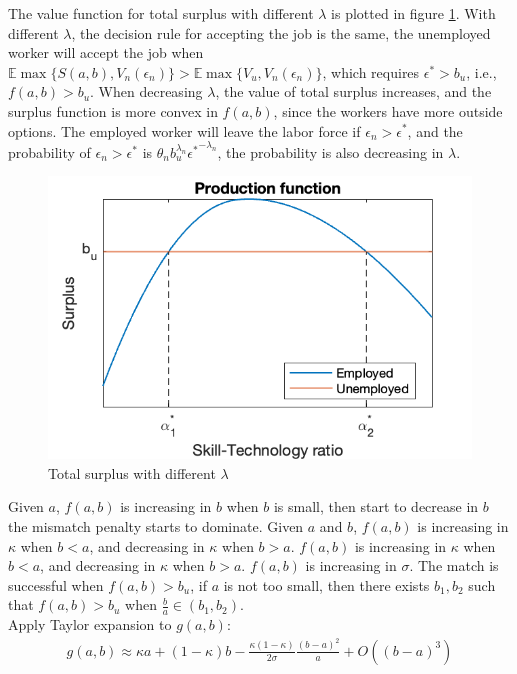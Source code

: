 \documentclass{article}
\newcommand{\E}{\mathbb{E}}
\newcommand{\1}{\mathbb{1}}
\begin{document}
The value function for total surplus with different $\lambda$ is plotted in figure \ref{Analytical1}. With different $\lambda$, the decision rule for accepting the job is the same, the unemployed worker will accept the job when $\E\max\{S(a,b),V_n(\epsilon_n)\}>\E\max \{V_u,V_n(\epsilon_n)\}$, which requires $\epsilon^*>b_u$, i.e., $f(a,b)>b_u$. When decreasing $\lambda$, the value of total surplus increases, and the surplus function is more convex in $f(a,b)$, since the workers have more outside options. The employed worker will leave the labor force if $\epsilon_n>\epsilon^*$, and the probability of $\epsilon_n>\epsilon^*$ is $\theta_n b_u^{\lambda_n}{\epsilon^*}^{-\lambda_n}$, the probability is also decreasing in $\lambda$. \\
\begin{figure}[h!]
\centering
\caption{Total surplus with different $\lambda$}
\label{Analytical1}
\includegraphics[width=\textwidth]{Analytical1}
\end{figure}

Given $a$, $f(a,b)$ is increasing in $b$ when $b$ is small, then start to decrease in $b$ the mismatch penalty starts to dominate. Given $a$ and $b$, $f(a,b)$ is increasing in $\kappa$ when $b<a$, and decreasing in $\kappa$ when $b>a$. $f(a,b)$ is increasing in $\kappa$ when $b<a$, and decreasing in $\kappa$ when $b>a$. $f(a,b)$ is increasing in $\sigma$. The match is successful when $f(a,b)>b_u$, if $a$ is not too small, then there exists $b_1, b_2$ such that $f(a,b)>b_u$ when $\frac{b}{a} \in (b_1,b_2)$. \\

Apply Taylor expansion to $g(a,b)$: 
\begin{align*}
g(a,b) \approx \kappa a+(1-\kappa) b-\frac{\kappa(1-\kappa)}{2\sigma}\frac{(b-a)^2}{a}+O((b-a)^3)
\end{align*}
\end{document}
